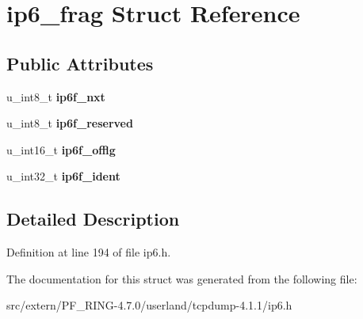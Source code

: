\hypertarget{structip6__frag}{
\section{ip6\_\-frag Struct Reference}
\label{structip6__frag}
}
\subsection*{Public Attributes}
\begin{DoxyCompactItemize}
\item 
\hypertarget{structip6__frag_aec2a6e11a49289f5efa80e3e570571ac}{
u\_\-int8\_\-t {\bfseries ip6f\_\-nxt}}
\label{structip6__frag_aec2a6e11a49289f5efa80e3e570571ac}

\item 
\hypertarget{structip6__frag_a8fbf135e0d7cd5c91f17433e8db7672b}{
u\_\-int8\_\-t {\bfseries ip6f\_\-reserved}}
\label{structip6__frag_a8fbf135e0d7cd5c91f17433e8db7672b}

\item 
\hypertarget{structip6__frag_a93a996608e6d4980c8eb9114d1ecd416}{
u\_\-int16\_\-t {\bfseries ip6f\_\-offlg}}
\label{structip6__frag_a93a996608e6d4980c8eb9114d1ecd416}

\item 
\hypertarget{structip6__frag_a245b2e6e4b48abeaa9530c629c6649af}{
u\_\-int32\_\-t {\bfseries ip6f\_\-ident}}
\label{structip6__frag_a245b2e6e4b48abeaa9530c629c6649af}

\end{DoxyCompactItemize}


\subsection{Detailed Description}


Definition at line 194 of file ip6.h.



The documentation for this struct was generated from the following file:\begin{DoxyCompactItemize}
\item 
src/extern/PF\_\-RING-\/4.7.0/userland/tcpdump-\/4.1.1/ip6.h\end{DoxyCompactItemize}
